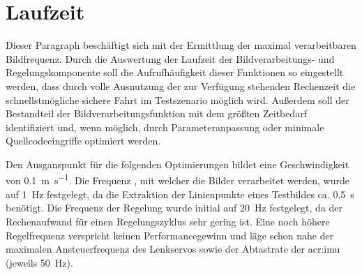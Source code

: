 \section{Laufzeit \dcsecondauthorshort}
\label{ssec:evaluation:messungen:laufzeit}
Dieser Paragraph beschäftigt sich mit der Ermittlung der maximal verarbeitbaren Bildfrequenz. Durch die Auswertung der Laufzeit der Bildverarbeitungs- und  Regelungskomponente soll die Aufrufhäufigkeit dieser Funktionen so eingestellt werden, dass durch volle Ausnutzung der zur Verfügung stehenden Rechenzeit die schnellstmögliche sichere Fahrt im Testszenario möglich wird.
Außerdem soll der Bestandteil der Bildverarbeitungsfunktion mit dem größten Zeitbedarf identifiziert und, wenn möglich, durch Parameteranpassung oder minimale Quellcodeeingriffe optimiert werden.


Den Ausganspunkt für die folgenden Optimierungen bildet eine Geschwindigkeit von
\SI{0.1}{\metre\per\second}. Die Frequenz , mit welcher die Bilder verarbeitet werden, wurde auf \SI{1}{\hertz} festgelegt, da die Extraktion der Linienpunkte eines Testbildes ca. \SI{0.5}{\second} benötigt. Die Frequenz der Regelung  wurde initial auf \SI{20}{\hertz} festgelegt, da der Rechenaufwand für einen Regelungszyklus sehr gering ist. Eine noch höhere Regelfrequenz verspricht keinen Performancegewinn und läge schon nahe der maximalen Ansteuerfrequenz des Lenkservos sowie der Abtastrate der \gls{acr:imu} (jeweils \SI{50}{\hertz}).


